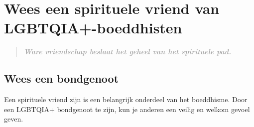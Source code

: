 \documentclass[12pt,openany]{book}
\begin{document}
\begin{figure}[h]
    \centering
\end{figure}

\chapter*{Wees een spirituele vriend van LGBTQIA+-boeddhisten}

\begin{quote}
\textit{\large \textbf{\textcolor{darkgray}{Ware vriendschap beslaat het geheel van het spirituele pad.}}}
\end{quote}

\section*{Wees een bondgenoot}

Een spirituele vriend zijn is een belangrijk onderdeel van het boeddhisme. Door een LGBTQIA+ bondgenoot te zijn, kun je anderen een veilig en welkom gevoel geven.
\end{document}
